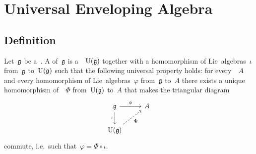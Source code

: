 \section{Universal Enveloping Algebra}





\subsection{Definition}


\begin{definition}
  Let~$\mathfrak{g}$ be a~\liealgebra{$\kf$}.
  A  of~$\mathfrak{g}$ is a~\algebra{$\kf$}~$\operatorname{U}(\mathfrak{g})$ together with a homomorphism of Lie~algebras~$\iota$ from~$\mathfrak{g}$ to~$\operatorname{U}(\mathfrak{g})$ such that the following universal property holds:
  for every~{\algebra{$\kf$}}~$A$ and every homomorphism of Lie~algebras~$\varphi$ from~$\mathfrak{g}$ to~$A$ there exists a unique homomorphism of~\algebras{$\kf$}~$\Phi$  from~$\operatorname{U}(\mathfrak{g})$ to~$A$ that makes the triangular diagram
  \[
    \begin{tikzcd}
      \glie
      \arrow{r}[above]{\phi}
      \arrow{d}[left]{\iota}
      &
      A
      \\
      \Univ(\glie)
      \arrow[dashed]{ur}[below right]{\Phi}
      &
      {}
    \end{tikzcd}
  \]
  commute, i.e.\ such that~$\varphi = \Phi \circ \iota$.
\end{definition}


